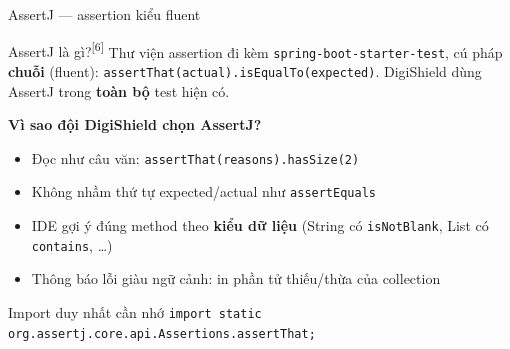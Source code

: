 \documentclass[aspectratio=169,12pt]{beamer}
\newcommand{\sref}[1]{\textsuperscript{\scriptsize[#1]}}
\begin{document}
\begin{frame}[shrink=8]{AssertJ --- assertion kiểu fluent}
  \begin{block}{AssertJ là gì?\sref{6}}
    Thư viện assertion đi kèm \texttt{spring-boot-starter-test}, cú pháp
    \textbf{chuỗi} (fluent): \texttt{assertThat(actual).isEqualTo(expected)}.
    DigiShield dùng AssertJ trong \textbf{toàn bộ} test hiện có.
  \end{block}

  \vspace{0.35em}
  \textbf{Vì sao đội DigiShield chọn AssertJ?}
  \begin{itemize}
    \item Đọc như câu văn: \texttt{assertThat(reasons).hasSize(2)}
    \item Không nhầm thứ tự expected/actual như \texttt{assertEquals}
    \item IDE gợi ý đúng method theo \textbf{kiểu dữ liệu}
          (String có \texttt{isNotBlank}, List có \texttt{contains}, \dots)
    \item Thông báo lỗi giàu ngữ cảnh: in phần tử thiếu/thừa của collection
  \end{itemize}

  \vspace{0.35em}
  \begin{exampleblock}{Import duy nhất cần nhớ}
    \texttt{import static org.assertj.core.api.Assertions.assertThat;}
  \end{exampleblock}
\end{frame}
\end{document}
